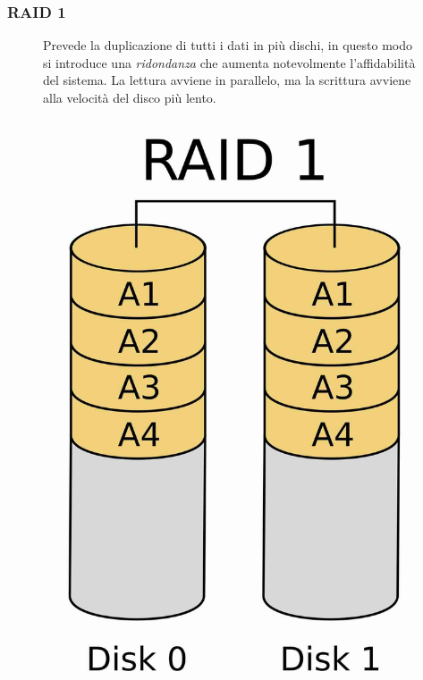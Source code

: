 \subsubsection*{RAID 1}
\begin{figure}[H]
    \centering
    \begin{minipage}{0.8\textwidth}
        Prevede la duplicazione di tutti i dati in più dischi, in questo modo si introduce una \textit{ridondanza} che aumenta notevolmente l'affidabilità del sistema.
        La lettura avviene in parallelo, ma la scrittura avviene alla velocità del disco più lento.

    \end{minipage}
    \hfill
    \begin{minipage}{0.15\textwidth}
        \centering
        \includegraphics[width=1\linewidth]{assets/RAID_1.jpeg}
    \end{minipage}
\end{figure}

